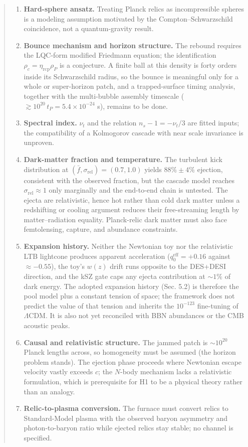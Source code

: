 \documentclass[
]{article}
\providecommand{\tightlist}{%
  \setlength{\itemsep}{0pt}\setlength{\parskip}{0pt}}
\begin{document}
\begin{quote}
\begin{enumerate}
\def\labelenumi{\arabic{enumi}.}
\tightlist
\item
  \textbf{Hard-sphere ansatz.} Treating Planck relics as incompressible
  spheres is a modeling assumption motivated by the
  Compton--Schwarzschild coincidence, not a quantum-gravity result.
\item
  \textbf{Bounce mechanism and horizon structure.} The rebound requires
  the LQC-form modified Friedmann equation; the identification
  \(\rho_c = \eta_{\text{rcp}}\rho_P\) is a conjecture. A finite ball at
  this density is forty orders inside its Schwarzschild radius, so the
  bounce is meaningful only for a whole or super-horizon patch, and a
  trapped-surface timing analysis, together with the multi-bubble
  assembly timescale (\(\gtrsim 10^{20}\,t_P = 5.4\times10^{-24}\) s),
  remains to be done.
\item
  \textbf{Spectral index.} \(\nu_t\) and the relation
  \(n_s - 1 = -\nu_t/3\) are fitted inputs; the compatibility of a
  Kolmogorov cascade with near scale invariance is unproven.
\item
  \textbf{Dark-matter fraction and temperature.} The turbulent kick
  distribution at \((\bar{f}, \sigma_{\text{rel}}) = (0.7, 1.0)\) yields
  \(88\% \pm 4\%\) ejection, consistent with the observed fraction, but
  the cascade model reaches \(\sigma_{\text{rel}} \approx 1\) only
  marginally and the end-to-end chain is untested. The ejecta are
  relativistic, hence hot rather than cold dark matter unless a
  redshifting or cooling argument reduces their free-streaming length by
  matter--radiation equality. Planck-relic dark matter must also face
  femtolensing, capture, and abundance constraints.
\item
  \textbf{Expansion history.} Neither the Newtonian toy nor the
  relativistic LTB lightcone produces apparent acceleration
  (\(q_0^{\text{eff}} = +0.16\) against \(\approx -0.55\)), the toy's
  \(w(z)\) drift runs opposite to the DES+DESI direction, and the kSZ
  gate caps any ejecta contribution at \(\sim\!1\%\) of dark energy. The
  adopted expansion history (Sec. 5.2) is therefore the pool model plus
  a constant tension of space; the framework does not predict the value
  of that tension and inherits the \(10^{-123}\) fine-tuning of
  \(\Lambda\)CDM. It is also not yet reconciled with BBN abundances or
  the CMB acoustic peaks.
\item
  \textbf{Causal and relativistic structure.} The jammed patch is
  \(\sim\!10^{20}\) Planck lengths across, so homogeneity must be
  assumed (the horizon problem stands). The ejection phase proceeds
  where Newtonian escape velocity vastly exceeds \(c\); the \(N\)-body
  mechanism lacks a relativistic formulation, which is prerequisite for
  H1 to be a physical theory rather than an analogy.
\item
  \textbf{Relic-to-plasma conversion.} The furnace must convert relics
  to Standard-Model plasma with the observed baryon asymmetry and
  photon-to-baryon ratio while ejected relics stay stable; no channel is
  specified.
\end{enumerate}
\end{quote}
\end{document}
